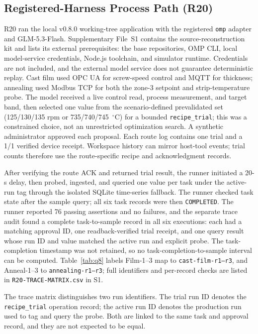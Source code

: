 \subsection{Registered-Harness Process Path (R20)}
\label{sec:harness-e2e}
R20 ran the local v0.8.0 working-tree application with the registered
\texttt{omp} adapter and GLM-5.3-Flash. Supplementary File~S1 contains the
source-reconstruction kit and lists its external prerequisites: the base
repositories, OMP CLI, local model-service credentials, Node.js toolchain, and
simulator runtime. Credentials are not included, and the external model
service does not guarantee deterministic replay. Cast film used OPC UA for screw-speed
control and MQTT for thickness; annealing used Modbus TCP for both the zone-3
setpoint and strip-temperature probe. The model received a live control read,
process measurement, and target band, then selected one value from the
scenario-defined prevalidated set (125/130/135 rpm or 735/740/745~$^{\circ}$C)
for a bounded \texttt{recipe\_trial}; this was a constrained choice, not an
unrestricted optimization search. A synthetic administrator approved each
proposal. Each route log contains one trial and a 1/1 verified device receipt.
Workspace history can mirror host-tool events; trial counts therefore use the
route-specific recipe and acknowledgment records.

After verifying the route ACK and returned trial result, the runner initiated
a 20-s delay, then probed, ingested, and queried one value per task under the
active-run tag through the isolated SQLite time-series fallback. The runner
checked task state after the sample query; all six task records were then
\texttt{COMPLETED}. The runner reported 76 passing assertions and no failures, and
the separate trace audit found a complete task-to-sample record in all six
executions: each had a matching approval ID, one readback-verified trial
receipt, and one query result whose run ID and value matched the active run and
explicit probe. The task-completion timestamp was not retained, so no
task-completion-to-sample interval can be computed. Table~\ref{tab:q8} labels
Film-1--3 map to \texttt{cast-film-r1--r3}, and Anneal-1--3 to
\texttt{annealing-r1--r3}; full identifiers and per-record checks are listed
in \texttt{R20-TRACE-MATRIX.csv} in S1.

The trace matrix distinguishes two run identifiers. The trial run ID denotes
the \texttt{recipe\_trial} operation record; the active run ID denotes the
production run used to tag and query the probe. Both are linked to the same
task and approval record, and they are not expected to be equal.

